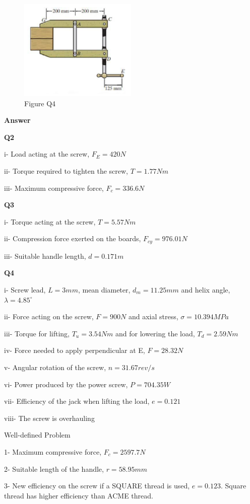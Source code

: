 \documentclass[a4paper, fleqn]{article}
\begin{document}
\begin{figure}[h]
    \centering
    \includegraphics[width=0.5\textwidth]{t2-q4.png}
    \caption{Figure Q4}
\end{figure}

\newpage

\textbf{Answer}
\vspace{10pt}

\textbf{Q2}

i- Load acting at the screw, $F_E=420N$

ii- Torque required to tighten the screw, $T=1.77Nm$

iii- Maximum compressive force, $F_c=336.6N$

\vspace{10pt}
\textbf{Q3}

i- Torque acting at the screw, $T=5.57Nm$

ii- Compression force exerted on the boards, $F_{cy}=976.01N$

iii- Suitable handle length, $d=0.171m$

\vspace{10pt}
\textbf{Q4}

i- Screw lead, $L=3mm$, mean diameter, $d_m=11.25mm$ and helix angle, $\lambda=4.85^{\circ}$

ii- Force acting on the screw, $F=900N$ and axial stress, $\sigma=10.394MPa$

iii- Torque for lifting, $T_u=3.54Nm$ and for lowering the load, $T_d=2.59Nm$

iv- Force needed to apply perpendicular at E, $F=28.32N$

v- Angular rotation of the screw, $n=31.67rev/s$

vi- Power produced by the power screw, $P=704.35W$

vii- Efficiency of the jack when lifting the load, $e=0.121$

viii- The screw is overhauling

\vspace{10pt}
Well-defined Problem

1- Maximum compressive force, $F_c=2597.7N$

2- Suitable length of the handle, $r=58.95mm$

3- New efficiency on the screw if a SQUARE thread is used, $e=0.123$. Square thread has higher efficiency than ACME thread.
\end{document}
